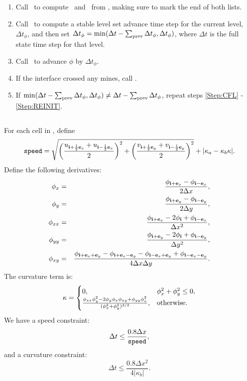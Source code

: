 \subsection{\ADVANCE}
\begin{enumerate}
\item Call \NARROWBAND~to compute \nband~and \mine~from \type, making sure to mark the end of both lists.
\item \label{Step:CFL} Call \LSCFL~to compute a stable level set advance time step for the current level, $\Delta t_\phi$, and then set $\Delta t_\phi = \min(\Delta t-\sum_{\rm prev}\Delta t_\phi, \Delta t_\phi)$, where $\Delta t$ is the full state time step for that level.
\item Call \PHIUPD~to advance $\phi$ by $\Delta t_\phi$.
\item \label{Step:REINIT} If the interface crossed any mines, call \REINIT.
\item If $\min(\Delta t-\sum_{\rm prev}\Delta t_\phi, \Delta t_\phi) \ne \Delta t-\sum_{\rm prev}\Delta t_\phi$, repeat steps \ref{Step:CFL} - \ref{Step:REINIT}.
\end{enumerate}
\subsection{\LSCFL}
For each cell in \nband, define 
\begin{equation}
{\rm {\tt speed}} = \sqrt{\left(\frac{u_{{\bf i}+\frac{1}{2}{\bf e}_x}+u_{{\bf i}-\frac{1}{2}{\bf e}_x}}{2}\right)^2 + \left(\frac{v_{{\bf i}+\frac{1}{2}{\bf e}_y}+v_{{\bf i}-\frac{1}{2}{\bf e}_y}}{2}\right)^2} + |\kappa_a - \kappa_b\kappa|.
\end{equation}
Define the following derivatives:
\begin{eqnarray}
\phi_x &=& \frac{\phi_{{\bf i}+{\bf e}_x}-\phi_{{\bf i}-{\bf e}_x}}{2\Delta x}, \\
\phi_y &=& \frac{\phi_{{\bf i}+{\bf e}_y}-\phi_{{\bf i}-{\bf e}_y}}{2\Delta y}, \\
\phi_{xx} &=& \frac{\phi_{{\bf i}+{\bf e}_x}-2\phi_{{\bf i}}+\phi_{{\bf i}-{\bf e}_x}}{\Delta x^2}, \\
\phi_{yy} &=& \frac{\phi_{{\bf i}+{\bf e}_y}-2\phi_{{\bf i}}+\phi_{{\bf i}-{\bf e}_y}}{\Delta y^2}, \\
\phi_{xy} &=& \frac{\phi_{{\bf i}+{\bf e}_x+{\bf e}_y}-\phi_{{\bf i}+{\bf e}_x-{\bf e}_y}-\phi_{{\bf i}-{\bf e}_x+{\bf e}_y}+\phi_{{\bf i}-{\bf e}_x-{\bf e}_y}}{4\Delta x\Delta y}.
\end{eqnarray}
The curvature term is:
\begin{equation}
\kappa = 
\begin{cases}
0, & \phi_x^2+\phi_y^2 \le 0, \\
\frac{\phi_{xx}\phi_y^2 - 2\phi_y\phi_x\phi_{xy} + \phi_{yy}\phi_x^2}{(\phi_x^2 + \phi_y^2)^{3/2}}, & {\rm otherwise}. \\
\end{cases}
\end{equation}
We have a speed constraint:
\begin{equation}
\Delta t \le \frac{0.8\Delta x}{{\rm {\tt speed}}},
\end{equation}
and a curvature constraint:
\begin{equation}
\Delta t \le \frac{0.8\Delta x^2}{4|\kappa_b|}.
\end{equation}
